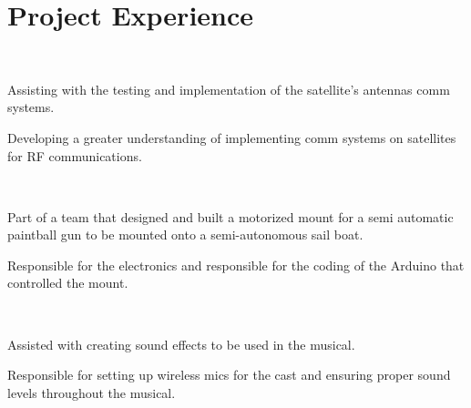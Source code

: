 \documentclass[]{hieudo-build}
\begin{document}
\begin{minipage}[t]{0.65\textwidth} 

\section{Project Experience}

\\
\vspace{0.9em} %
\begin{tightemize}
\item Assisting with the testing and implementation of the satellite’s antennas comm systems.
\item Developing a greater understanding of implementing comm systems on satellites for RF communications.
\end{tightemize}
\sectionsep

 \\
\begin{tightemize}
\item Part of a team that designed and built a motorized mount for a semi automatic paintball gun to be mounted onto a semi-autonomous sail boat.
\item Responsible for the electronics and responsible for the coding of the Arduino that controlled the mount.
\end{tightemize}
\sectionsep

 \\
\begin{tightemize}
\item Assisted with creating sound effects to be used in the musical.
\item Responsible for setting up wireless mics for the cast and ensuring proper sound levels throughout the musical.
\end{tightemize}
\sectionsep



\end{minipage}
\end{document}
